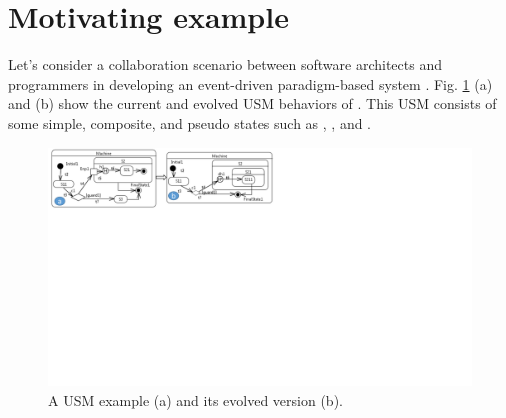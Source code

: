 \section{Motivating example%
	}
\label{sec:motivation}
Let's consider a collaboration scenario between software architects and programmers in developing an event-driven paradigm-based system . 
Fig. \ref{fig:illustration} (a) and (b) show the current and evolved USM behaviors of .
This USM consists of some simple, composite, and pseudo states such as , , and .

\begin{figure}
	\centering
	\includegraphics[clip, trim=0.2cm 14cm 15.8cm 0.1cm, width=1.0\columnwidth]{figures/illustration}
	\caption{A USM example (a) and its evolved version (b).} 
	\label{fig:illustration}
\end{figure}


